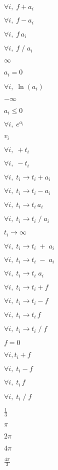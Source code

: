 \documentclass{article}
\begin{document}
$\forall i,\;f + a_i$
\pagebreak

$\forall i,\;f - a_i$
\pagebreak

$\forall i,\;f\,a_i$
\pagebreak

$\forall i,\;f\;/\;a_i$
\pagebreak

$\infty$
\pagebreak

$a_i=0$
\pagebreak

$\forall i,\;\ln (a_i)$
\pagebreak

$-\infty$
\pagebreak

$a_i\leq 0$
\pagebreak

$\forall i,\;e^{a_i}$
\pagebreak

$v_i$
\pagebreak

$\forall i,\;+t_i$
\pagebreak

$\forall i,\;-t_i$
\pagebreak

$\forall i,\;t_i \rightarrow t_i + a_i$
\pagebreak

$\forall i,\;t_i \rightarrow t_i - a_i$
\pagebreak

$\forall i,\;t_i \rightarrow t_i\,a_i$
\pagebreak

$\forall i,\;t_i \rightarrow t_i\;/\;a_i$
\pagebreak

$t_i \rightarrow \infty$
\pagebreak

$\forall i,\;t_i \rightarrow t_i\;+\;a_i$
\pagebreak

$\forall i,\;t_i \rightarrow t_i\;-\;a_i$
\pagebreak

$\forall i,\;t_i \rightarrow t_i\;a_i$
\pagebreak

$\forall i,\;t_i \rightarrow t_i + f$
\pagebreak

$\forall i,\;t_i \rightarrow t_i - f$
\pagebreak

$\forall i,\;t_i \rightarrow t_i\,f$
\pagebreak

$\forall i,\;t_i \rightarrow t_i\;/\;f$
\pagebreak

$f=0$
\pagebreak

$\forall i, t_i + f$
\pagebreak

$\forall i,\; t_i - f$
\pagebreak

$\forall i,\; t_i\,f$
\pagebreak

$\forall i,\; t_i\;/\;f$
\pagebreak

$\frac{1}{3}$
\pagebreak

$\pi$
\pagebreak

$2\pi$
\pagebreak

$4\pi$
\pagebreak

$\frac{4\pi}{3}$
\pagebreak
\end{document}
